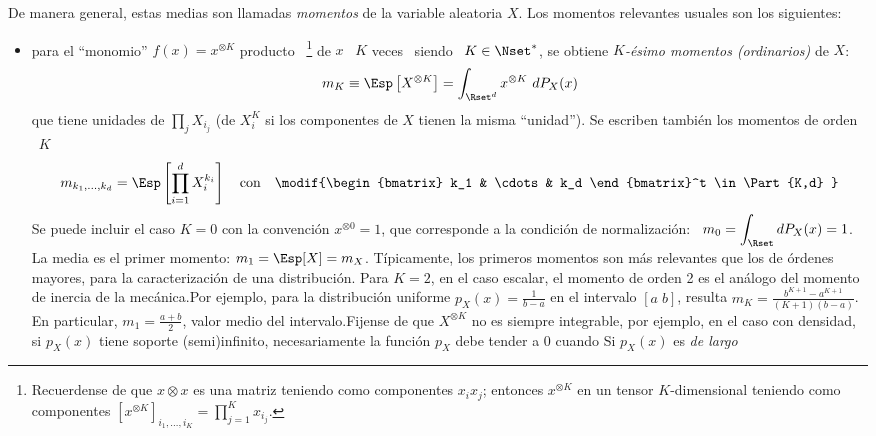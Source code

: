 De  manera general,  estas medias  son llamadas  {\it momentos}  de  la variable
aleatoria $X$. Los momentos relevantes usuales son los siguientes:
%
\begin{itemize}
\item    para    el    ``monomio''    $f(x)   =    x^{\otimes    K}$    producto
  ~\footnote{Recuerdense  de  que $x  \otimes  x$  es una  matriz
    teniendo como componentes  $x_i x_j$; entonces $x^{\otimes K}$  en un tensor
    $K$-dimensional teniendo como  componentes $ \displaystyle \left[ x^{\otimes
        K}  \right]_{i_1,\ldots,i_K} =  \prod_{j=1}^K x_{i_j}$.}
   de $x$  \ $K$
  veces \ siendo \ $K \in \Nset^*$, se obtiene  $K${\it-\'esimo momentos (ordinarios)} de $X$:
  \[
  m_K \equiv \Esp\left[  X^{\otimes K} \right] = \int_{\Rset^d}  x^{\otimes K} \
  dP_X(x)
  \]
  que tiene unidades de $\prod_j X_{i_j}$  (de $X_i^K$ si los componentes de $X$
  tienen la  misma ``unidad'').  Se escriben  tambi\'en los momentos  de orden \
  $K$ \ 
  \[
  m_{k_1,\ldots,k_d}   =  \Esp\left[   \prod_{i=1}^d  X_i^{k_i}   \right]  \quad
  \mbox{con}  \quad \modif{\begin{bmatrix}  k_1 &  \cdots &  k_d \end{bmatrix}^t
    \in \Part{K,d} }
  \]
     Se puede incluir el caso $K=0$ con
  la  convenci\'on $x^{\otimes  0} =  1$, que  corresponde a  la  condici\'on de
  normalizaci\'on: \ $\displaystyle m_0 =  \int_\Rset dP_X(x) = 1$.  La media es
  el  primer  momento: $m_1  =  \Esp[X]  =  m_X$.  T\'ipicamente,  los  primeros
  momentos  son  m\'as  relevantes  que   los  de  \'ordenes  mayores,  para  la
  caracterizaci\'on de una distribuci\'on.  Para $K = 2$, en el caso escalar, el
  momento  de   orden  2  es  el   an\'alogo  del  momento  de   inercia  de  la
  mec\'anica.\newline  Por ejemplo,  para la  distribuci\'on uniforme  $p_X(x) =
  \frac{1}{b-a}$   en   el   intervalo   $[   a   \;   b]$,   resulta   $m_K   =
  \frac{b^{K+1}-a^{K+1}}{(K+1)(b-a)}$.   En particular,  $m_1  = \frac{a+b}{2}$,
  valor  medio del  intervalo.\newline  Fijense  de que  $X^{\otimes  K}$ no  es
  siempre integrable,  por ejemplo, en el  caso con densidad,  si $p_X(x)$ tiene
  soporte  (semi)infinito, necesariamente  la funci\'on  $p_X$ debe  tender  a 0
  cuando \modif{$\|  x \|  \rightarrow \infty$.}  Si  $p_X(x)$ es {\it  de largo
}
\end{itemize}
